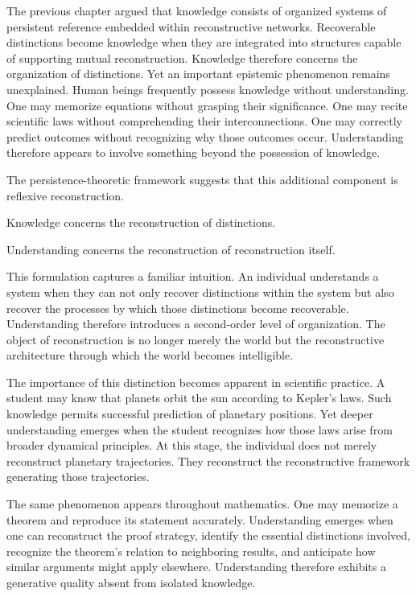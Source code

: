 \documentclass[12pt,oneside]{article}
\theoremstyle{definition}
\begin{document}
The previous chapter argued that knowledge consists of organized systems of persistent reference embedded within reconstructive networks. Recoverable distinctions become knowledge when they are integrated into structures capable of supporting mutual reconstruction. Knowledge therefore concerns the organization of distinctions. Yet an important epistemic phenomenon remains unexplained. Human beings frequently possess knowledge without understanding. One may memorize equations without grasping their significance. One may recite scientific laws without comprehending their interconnections. One may correctly predict outcomes without recognizing why those outcomes occur. Understanding therefore appears to involve something beyond the possession of knowledge.

The persistence-theoretic framework suggests that this additional component is reflexive reconstruction.

Knowledge concerns the reconstruction of distinctions.

Understanding concerns the reconstruction of reconstruction itself.

This formulation captures a familiar intuition. An individual understands a system when they can not only recover distinctions within the system but also recover the processes by which those distinctions become recoverable. Understanding therefore introduces a second-order level of organization. The object of reconstruction is no longer merely the world but the reconstructive architecture through which the world becomes intelligible.

The importance of this distinction becomes apparent in scientific practice. A student may know that planets orbit the sun according to Kepler's laws. Such knowledge permits successful prediction of planetary positions. Yet deeper understanding emerges when the student recognizes how those laws arise from broader dynamical principles. At this stage, the individual does not merely reconstruct planetary trajectories. They reconstruct the reconstructive framework generating those trajectories.

The same phenomenon appears throughout mathematics. One may memorize a theorem and reproduce its statement accurately. Understanding emerges when one can reconstruct the proof strategy, identify the essential distinctions involved, recognize the theorem's relation to neighboring results, and anticipate how similar arguments might apply elsewhere. Understanding therefore exhibits a generative quality absent from isolated knowledge.
\end{document}
